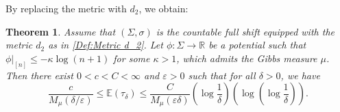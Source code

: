 \documentclass[11pt, reqno]{amsart}
\theoremstyle{plain}%
\newtheorem{theorem}{Theorem}[section]
\theoremstyle{definition}
\theoremstyle{definition}
\def\R{\ensuremath{\mathbb R}}
\def\E{\mathbb E}
\def\st{such that }
\numberwithin{equation}{section}
\begin{document}
By replacing the metric with $d_2$, we obtain:
\begin{theorem}\label{Theorem: main theorem 2}
   Assume that $(\Sigma,\sigma)$ is the countable full shift equipped with the metric $d_2$ as in \eqref{Def:Metric d_2}. Let $\phi:\Sigma\to\R$ be a potential \st $\phi\big|_{[n]}\le -\kappa\log (n+1)$ for some $\kappa>1$, which admits the Gibbs measure $\mu$. Then there exist $0<c<C<\infty$ and $\varepsilon>0$ such that for all $\delta>0$, we have
$$\frac{c}{M_\mu(\delta/\varepsilon)}\le\E(\tau_\delta)\le \frac{C}{M_\mu(\varepsilon\delta)}\left(\log\frac1{\delta}\right)\left(\log\left(\log\frac1{\delta}\right)\right).$$


\end{theorem}
\end{document}
